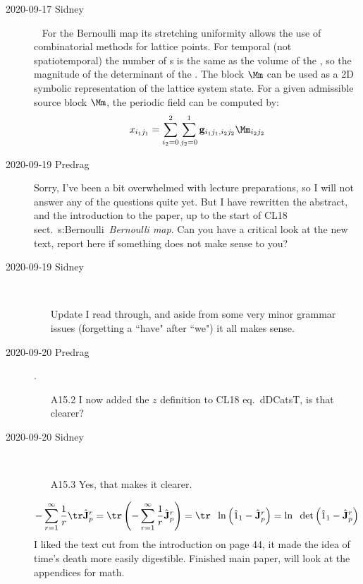 \begin{description}
\item[2020-09-17 Sidney]~
For the Bernoulli map its stretching uniformity allows the use of
combinatorial methods for lattice points. For temporal (not spatiotemporal)
the number of {\lattstate}s is the same as the volume of the
{\fundPip}, so the magnitude of the determinant of the {\jacobianOrb}. The
block $\Mm$ can be used as a 2D symbolic representation of the lattice system
state. For a given admissible source block $\Mm$, the periodic field can be
computed by:
\[
\ssp_{i_1j_1}=\sum_{i_2=0}^2\sum_{j_2=0}^1\mathbf{g}_{i_1j_1,i_2j_2}\Mm_{i_2j_2}
\]


\item[2020-09-19 Predrag]
Sorry, I've been a bit overwhelmed with lecture preparations, so
I will not answer any of the questions quite yet. But I have rewritten the
abstract, and the introduction to the paper, up to
the start of CL18 sect.~{s:Bernoulli}~{\em Bernoulli map}.
Can you have a critical look at the new text, report here if
something does not make sense to you?

\item[2020-09-19 Sidney]~~
\begin{itemize}
	\item[Update]
I read through, and aside from some very minor grammar issues (forgetting
a ``have" after ``we")
it all makes sense.
\end{itemize}

\item[2020-09-20 Predrag].
\begin{itemize}
	\item[A15.2]
I now added the $z$ definition to CL18 eq.~{dDCatsT},
is that clearer?
\end{itemize}

\item[2020-09-20 Sidney]~~
\begin{itemize}
	\item[A15.3]
Yes, that makes it clearer.
\end{itemize}
$$-\sum^{\infty}_{r=1}\frac{1}{r}\tr\hat{\mathbf{J}}_p^r
=\tr\left(-\sum^{\infty}_{r=1}\frac{1}{r}\hat{\mathbf{J}}_p^r\right)
= \tr\hspace{2mm}\ln\left(\hat{1}_1-\hat{\mathbf{J}}_p^r\right)
= \ln\hspace{2mm}\det\left(\hat{1}_1-\hat{\mathbf{J}}_p^r\right)$$
I liked the text cut from the introduction on page 44, it made the idea of time's death more easily digestible. Finished main paper, will look at the appendices for math.


\end{description}
